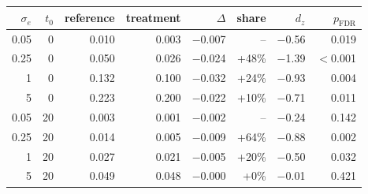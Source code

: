 \begin{tabular}{rrrrrrrr}
\toprule
$\sigma_e$ & $t_0$ & reference & treatment & $\Delta$ & share & $d_z$ & $p_{\text{FDR}}$ \\
\midrule
0.05 & 0 & 0.010 & 0.003 & $-$0.007 & -- & $-$0.56 & 0.019 \\
0.25 & 0 & 0.050 & 0.026 & $-$0.024 & +48\% & $-$1.39 & $<$0.001 \\
1 & 0 & 0.132 & 0.100 & $-$0.032 & +24\% & $-$0.93 & 0.004 \\
5 & 0 & 0.223 & 0.200 & $-$0.022 & +10\% & $-$0.71 & 0.011 \\
0.05 & 20 & 0.003 & 0.001 & $-$0.002 & -- & $-$0.24 & 0.142 \\
0.25 & 20 & 0.014 & 0.005 & $-$0.009 & +64\% & $-$0.88 & 0.002 \\
1 & 20 & 0.027 & 0.021 & $-$0.005 & +20\% & $-$0.50 & 0.032 \\
5 & 20 & 0.049 & 0.048 & $-$0.000 & +0\% & $-$0.01 & 0.421 \\
\bottomrule
\end{tabular}
